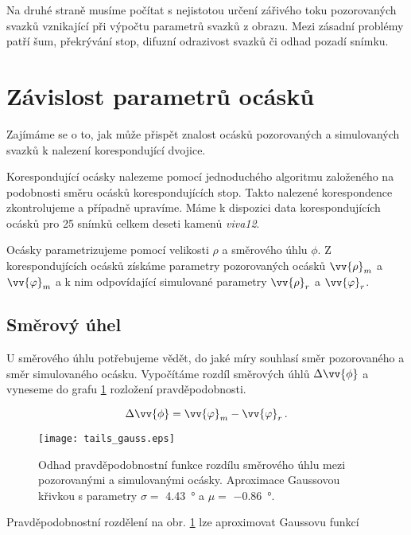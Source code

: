 Na druhé straně musíme počítat s nejistotou určení zářivého toku pozorovaných svazků vznikající při výpočtu parametrů svazků z obrazu. Mezi zásadní problémy patří šum, překrývání stop, difuzní odrazivost svazků či odhad pozadí snímku.  


\section{Závislost parametrů ocásků}

	Zajímáme se o to, jak může přispět znalost ocásků pozorovaných a simulovaných svazků k nalezení korespondující dvojice.  

  Korespondující ocásky nalezeme pomocí jednoduchého algoritmu založeného na podobnosti směru ocásků korespondujících stop. Takto nalezené korespondence zkontrolujeme a případně upravíme. Máme k dispozici data korespondujících ocásků pro 25 snímků celkem deseti kamenů \textit{viva12}. 
	
	Ocásky parametrizujeme pomocí velikosti $\rho$ a směrového úhlu $\phi$. Z korespondujících ocásků získáme parametry pozorovaných ocásků $\vv{\rho}_m$ a $\vv{\varphi}_m$ a k nim odpovídající simulované parametry $\vv{\rho}_r$ a $\vv{\varphi}_r$.
	

\subsection{Směrový úhel}
 U směrového úhlu potřebujeme vědět, do jaké míry souhlasí směr pozorovaného a směr simulovaného ocásku. Vypočítáme rozdíl směrových úhlů $\Delta\vv{\phi}$ a vyneseme do grafu \ref{fig: tail_depend1} rozložení pravděpodobnosti.  
 
 \begin{equation}
 \Delta\vv{\phi} = \vv{\varphi}_m - \vv{\varphi}_r\,.
 \end{equation}
  
\begin{figure}[htps]
\centering
\texttt{[image: tails\_gauss.eps]}
\caption[Odhad pravděpodobnostní funkce rozdílu směrového úhlu mezi pozorovanými a simulovanými ocásky.]{Odhad pravděpodobnostní funkce rozdílu směrového úhlu mezi pozorovanými a simulovanými ocásky. Aproximace Gaussovou křivkou s parametry $\sigma = $ \SI{4.43}{\degree} a $\mu = $ \SI{-0.86}{\degree}. }
\label{fig: tail_depend1}
\end{figure}

Pravděpodobnostní rozdělení na obr. \ref{fig: tail_depend1} lze aproximovat Gaussovu funkcí

